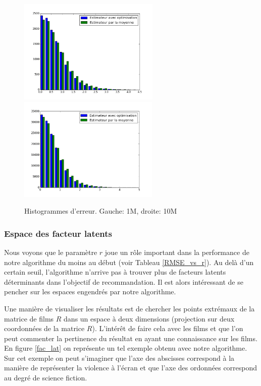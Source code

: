 \documentclass[10pt,a4paper]{article}
\begin{document}
\begin{figure}[h]
\begin{center}
\includegraphics[height=5cm]{fig/histo}
\includegraphics[height=5cm]{fig/histo10m}
\caption{\label{histo_best} Histogrammes d'erreur. Gauche: 1M, droite: 10M}
\end{center}
\end{figure}


\subsubsection*{Espace des facteur latents}

Nous voyons que le paramètre $r$ joue un rôle important dans la performance de notre algorithme du moins au début (voir Tableau \ref{RMSE_vs_r}). Au delà d'un certain seuil, l'algorithme n'arrive pas à trouver plus de facteurs latents déterminants dans l'objectif de recommandation. Il est alors intéressant de se pencher sur les espaces engendrés par notre algorithme. 

Une manière de visualiser les résultats est de chercher les points extrémaux de la matrice de films $R$ dans un espace à deux dimensions (projection sur deux coordonnées de la matrice $R$). L'intérêt de faire cela avec les films et que l'on peut commenter la pertinence du résultat en ayant une connaissance sur les films. En figure \ref{fac_lat} on représente un tel exemple obtenu avec notre algorithme. Sur cet exemple on peut s'imaginer que l'axe des abscisses correspond à la manière de représenter la violence à l'écran et que l'axe des ordonnées correspond au degré de science fiction.
\end{document}
